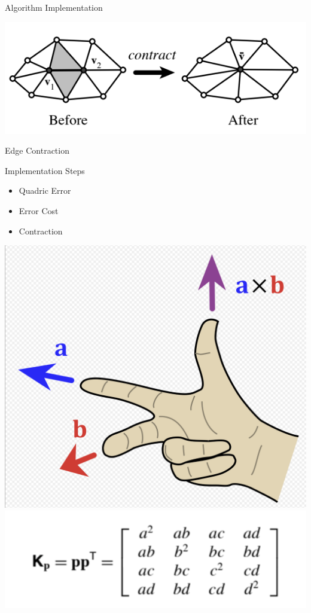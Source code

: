 \begin{frame}{Algorithm Implementation}
    \begin{center}
         \includegraphics[scale=0.7]{images/edge-contract.png}
         
         
    \end{center}
     \begin{center}
        Edge Contraction
    \end{center}

\end{frame}
\begin{frame}{Implementation Steps}
    \begin{center}
        \begin{itemize}
            \item Quadric Error 
            \item Error Cost 
            \item Contraction
        \end{itemize}
    \end{center}

   \includegraphics[scale=.1]{images/crossproduct.png}
    \includegraphics[scale=.8]{images/matrix.png}

\end{frame}

